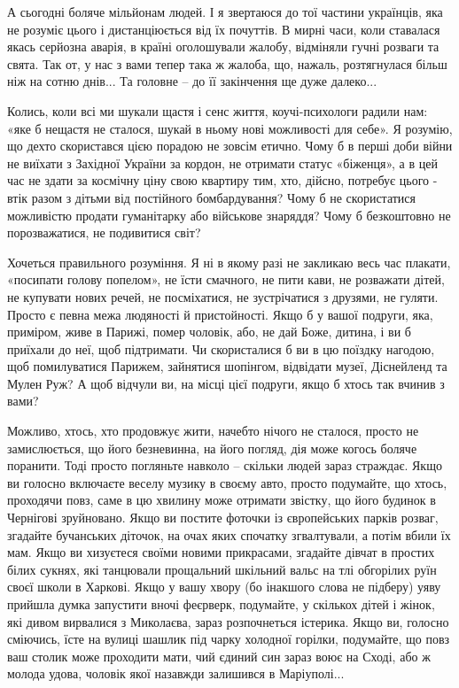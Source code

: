 А сьогодні боляче мільйонам людей. І я звертаюся до тої частини українців,
яка не розуміє цього і дистанціюється від їх почуттів. В мирні часи, коли
ставалася якась серйозна аварія, в країні оголошували жалобу, відміняли
гучні розваги та свята. Так от, у нас з вами тепер така ж жалоба, що,
нажаль, розтягнулася більш ніж на сотню днів... Та головне – до її
закінчення ще дуже далеко...

Колись, коли всі ми шукали щастя і сенс життя, коучі-психологи радили нам:
«яке б нещастя не сталося, шукай в ньому нові можливості для себе». Я
розумію, що дехто скористався цією порадою не зовсім етично. Чому б в
перші доби війни не виїхати з Західної України за кордон, не отримати
статус «біженця», а в цей час не здати за космічну ціну свою квартиру тим,
хто, дійсно, потребує цього - втік разом з дітьми від постійного
бомбардування? Чому б не скористатися можливістю продати гуманітарку або
військове знаряддя? Чому б безкоштовно не порозважатися, не подивитися
світ?

Хочеться правильного розуміння. Я ні в якому разі не закликаю весь час
плакати, «посипати голову попелом», не їсти смачного, не пити кави, не
розважати дітей, не купувати нових речей, не посміхатися, не зустрічатися
з друзями, не гуляти. Просто є певна межа людяності й пристойності.  Якщо
б у вашої подруги, яка, приміром, живе в Парижі, помер чоловік, або, не
дай Боже, дитина, і ви б приїхали до неї, щоб підтримати. Чи скористалися
б ви в цю поїздку нагодою, щоб помилуватися Парижем, зайнятися шопінгом,
відвідати музеї, Діснейленд та Мулен Руж? А щоб відчули ви, на місці цієї
подруги, якщо б хтось так вчинив з вами?

Можливо, хтось, хто продовжує жити, начебто нічого не сталося, просто не
замислюється, що його безневинна, на його погляд, дія може когось боляче
поранити. Тоді просто погляньте навколо – скільки людей зараз страждає.
Якщо ви голосно включаєте веселу музику в своєму авто, просто подумайте,
що хтось, проходячи повз, саме в цю хвилину може отримати звістку, що його
будинок в Чернігові зруйновано. Якщо ви постите фоточки із європейських
парків розваг, згадайте бучанських діточок, на очах яких спочатку
згвалтували, а потім вбили їх мам.  Якщо ви хизуєтеся своїми новими
прикрасами, згадайте дівчат в простих білих сукнях, які танцювали
прощальний шкільний вальс на тлі обгорілих руїн своєї школи в Харкові.
Якщо у вашу хвору (бо інакшого слова не підберу) уяву прийшла думка
запустити вночі феєрверк, подумайте, у скількох дітей і жінок, які дивом
вирвалися з Миколаєва, зараз розпочнеться істерика. Якщо ви, голосно
сміючись, їсте на вулиці шашлик під чарку холодної горілки, подумайте, що
повз ваш столик може проходити мати, чий єдиний син зараз воює на Сході,
або ж молода удова, чоловік якої назавжди залишився в Маріуполі...

